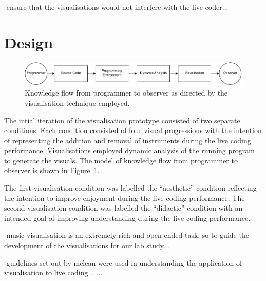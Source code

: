 -ensure that the visualisations would not interfere with the live coder... \more

\section{Design}

\begin{figure}
  \centering \includegraphics[width=\columnwidth]{../images/diagrams/knowledge-flow-initial.pdf}
  \caption{Knowledge flow from programmer to observer as directed by the visualisation technique employed.}
\label{fig:knowledge-flow-initial}
\end{figure}

The intial iteration of the visualisation prototype consisted of two separate conditions. Each condition consisted of four visual progressions with the intention of representing the addition and removal of instruments during the live coding performance. Visualisations employed dynamic analysis of the running program to generate the visuals. The model of knowledge flow from programmer to observer is shown in Figure~\ref{fig:knowledge-flow-initial}.

The first visualisation condition was labelled the ``aesthetic'' condition reflecting the intention to improve enjoyment during the live coding performance. The second visualisation condition was labelled the ``didactic'' condition with an intended goal of improving understanding during the live coding performance.


-music visualisation is an extremely rich and open-ended task, so to guide the development of the visualisations for our lab study... \more

-guidelines set out by mclean were used in understanding the application of visualisation to live coding...
\cite{McLean2010a}... \more


